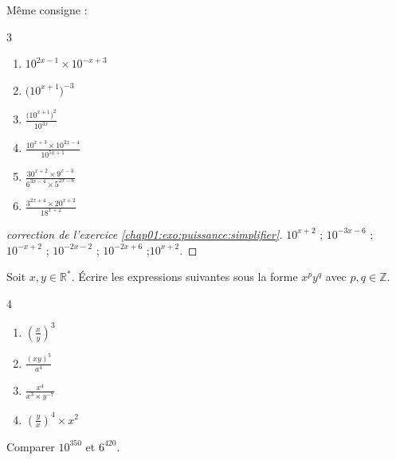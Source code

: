 \begin{exercise}[À vous] \label{chap01:exo:puissance:simplifier} Même consigne :
	\begin{multicols}{3} 
		\begin{enumerate}[label={\alph*)\rule{0pt}{1.8em}},leftmargin=*]
			\item  $10^{2x-1} \times 10^{-x+3}$  
			\item $\big(10^{x+1}\big)^{-3}$ 
			\item $\frac{\big(10^{x+1}\big)^2}{10^{3x}}$  
			\item $\frac{10^{x+3}\times 10^{2x-4}}{10^{5x+1}} $ 
			\item $\frac{ 30^{x+2} \times 9^{x-3}}{6^{3x-4}\times 5^{2x-6}} $ 
			\item $\frac{3^{2x+4}\times 20^{x+2}}{18^{x+2} }$
		\end{enumerate}
	\end{multicols} 
\end{exercise} 
\begin{proof}[correction de l'exercice \ref{chap01:exo:puissance:simplifier}]  $10^{x+2}$  ; $10^{-3x-6}$ ; $10^{-x+2}$ ; $10^{-2x-2}$ ; $10^{-2x+6 }$ ;$10^{x+2}$.
\end{proof}
\begin{exercise}  
	Soit $x,y\in\mathbb{R}^*$. Écrire les expressions suivantes sous la forme $x^p y^q$ avec $p,q\in\mathbb{Z}$. 
	\begin{multicols}{4} 
		\begin{enumerate}[label={\alph*)\rule{0pt}{1.8em}},leftmargin=*]
			\item  $\left(\frac{x}{y}\right)^3$  
			\item $\frac{(xy)^5}{a^4} $ 
			\item $\frac{x^4}{x^3\times y^{-7}} $  
			\item $\left(\frac{y}{x}\right)^4 \times x^2 $  
		\end{enumerate}
	\end{multicols}   
\end{exercise} 
\begin{exercise}
	Comparer $10^{350}$ et $6^{420}$.
\end{exercise}



%	 
